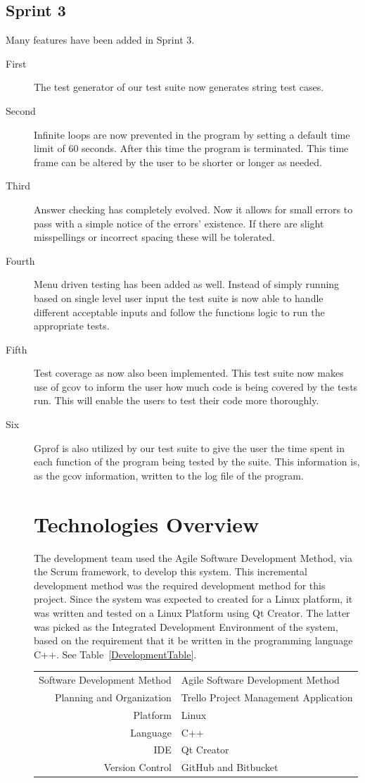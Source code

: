 \subsection{Sprint 3}
Many features have been added in Sprint 3. 
\begin{description}
\item[First      ]The test generator of our test suite now generates string test cases.
\item[Second]Infinite loops are now prevented in the program by setting a default time limit of 60 seconds. After this time the program is terminated. This time frame can be altered by the user to be shorter or longer as needed.
\item[Third   ]Answer checking has completely evolved. Now it allows for small errors to pass with a simple notice of the errors' existence. If there are slight misspellings or incorrect spacing these will be tolerated.
\item[Fourth      ]Menu driven testing has been added as well. Instead of simply running based on single level user input the test suite is now able to handle different acceptable inputs and follow the functions logic to run the appropriate tests.
\item[Fifth   ]Test coverage as now also been implemented. This test suite now makes use of gcov to inform the user how much code is being covered by the tests run. This will enable the users to test their code more thoroughly.
\item[Six   ]Gprof is also utilized by our test suite to give the user the time spent in each function of the program being tested by the suite. This information is, as the gcov information, written to the log file of the program. 

\section{Technologies Overview}
The development team used the Agile Software Development Method, via the Scrum framework, to develop
this system.  This incremental development method was the required development method for this project.
Since the system was expected to created for a Linux platform, it was written and tested on a Linux Platform 
using Qt Creator.  The latter was picked as the Integrated Development Environment of the system, based on
the requirement that it be written in the programming language C++.
See Table~\ref{DevelopmentTable}.  
\begin{table}[tbh]
\begin{center}
\begin{tabular}{|r|l|}
  \hline
  Software Development Method & Agile Software Development Method \\
  Planning and Organization & Trello Project Management Application \\
  \hline \hline
  Platform & Linux \\
  Language & C++ \\  
  IDE & Qt Creator \\
  Version Control & GitHub and Bitbucket
  \\ \cline{2-2}
  

\end{tabular}
\end{center}
\end{table}
\end{description}
